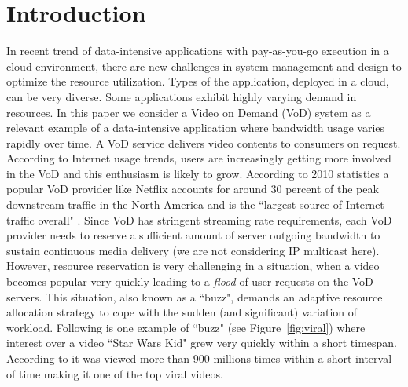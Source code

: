 \documentclass[twoside]{article}
\newcommand{\roy}[2]{#2}
\begin{document}
\makeRR   \tableofcontents
\section{Introduction}
\label{sec:intro}

In recent trend of data-intensive applications with pay-as-you-go execution in a cloud environment, there are new challenges in system management and design to optimize the resource utilization. Types of the application, deployed in a cloud, can be very diverse. \roy{There are some applications that need to be rapidly cloned or re-allocated, like a pre-production environment.}{} Some applications exhibit highly varying demand in resources. In this paper we consider a Video on Demand (VoD) system as a relevant example of a data-intensive application where bandwidth usage varies rapidly over time. \newline
A VoD service delivers video contents to consumers on request. According to Internet usage trends, users are increasingly getting more involved in the VoD and this enthusiasm is likely to grow. According to 2010 statistics a popular VoD provider like Netflix accounts for around 30 percent of  the peak downstream traffic in the North America and is the ``largest source of Internet traffic overall" \cite{website:sandvine}. Since VoD has stringent streaming rate requirements, each VoD provider needs to reserve a sufficient amount of server outgoing bandwidth to sustain continuous media delivery (we are not considering IP multicast here). However, resource reservation is very challenging in a situation, when a video becomes popular very quickly leading to a \emph{flood} of user requests on the VoD servers. This situation, also known as a ``buzz", demands an adaptive resource allocation strategy to cope with the sudden (and significant) variation of workload. Following is one example of ``buzz" (see Figure~\ref{fig:viral}) where interest over a video ``Star Wars Kid" \cite{website:waxy} grew very quickly within a short timespan. According to \cite{website:bbc} it was viewed more than 900 millions times within a short interval of time making it one of the top viral videos.
\end{document}
